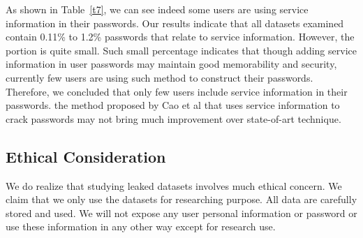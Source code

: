 As shown in Table~\ref{t7}, we can see indeed some users are using service information in their passwords. Our results indicate that all datasets examined contain 0.11\% to 1.2\% passwords that relate to service information. However, the portion is quite small. Such small percentage indicates that though adding service information in user passwords may maintain good memorability and security, currently few users are using such method to construct their passwords. Therefore, we concluded that only few users include service information in their passwords. the method proposed by Cao et al that uses service information to crack passwords may not bring much improvement over state-of-art technique.


\subsection{Ethical Consideration}
We do realize that studying leaked datasets involves much ethical concern. We claim that we only use the datasets for researching purpose. All data are carefully stored and used. We will not expose any user personal information or password or use these information in any other way except for research use.
